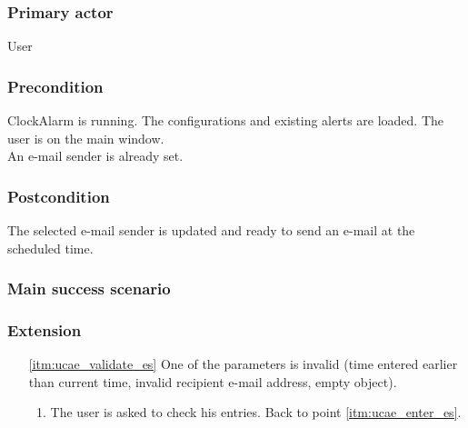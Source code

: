 \subsubsection{Primary actor}
User
\subsubsection{Precondition}
ClockAlarm is running. The configurations and existing alerts are loaded. The user is on the main window.
\\An e-mail sender is already set.
\subsubsection{Postcondition}
The selected e-mail sender is updated and ready to send an e-mail at the scheduled time.
\subsubsection{Main success scenario}
\subsubsection{Extension}
\begin{enumerate}
	\item[\ref{itm:ucae_validate_es}] One of the parameters is invalid (time entered earlier than current time, invalid recipient e-mail address, empty object).
	\begin{enumerate}[i]
		\item The user is asked to check his entries. Back to point \ref{itm:ucae_enter_es}.
	\end{enumerate}
\end{enumerate}
